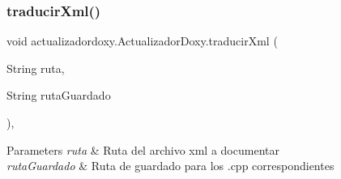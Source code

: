 \subsubsection{\texorpdfstring{traducir\+Xml()}{traducirXml()}}
{\footnotesize\ttfamily void actualizadordoxy.\+Actualizador\+Doxy.\+traducir\+Xml (\begin{DoxyParamCaption}\item[{String}]{ruta,  }\item[{String}]{ruta\+Guardado }\end{DoxyParamCaption})\hspace{0.3cm}{\ttfamily [inline]}, {\ttfamily [private]}}


\begin{DoxyParams}{Parameters}
{\em ruta} & Ruta del archivo xml a documentar \\
\hline
{\em ruta\+Guardado} & Ruta de guardado para los .cpp correspondientes \\
\hline
\end{DoxyParams}


